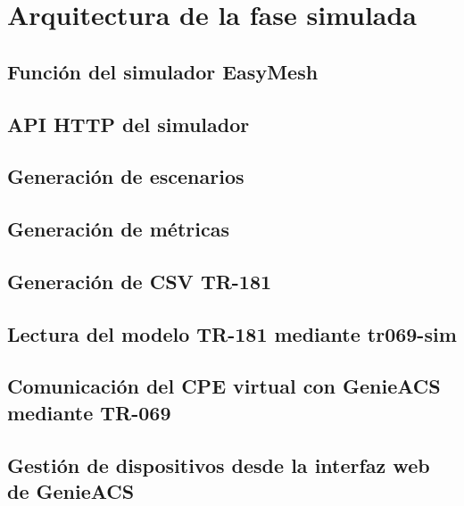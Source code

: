 \section{Arquitectura de la fase simulada}
\label{sec:arquitectura-fase-simulada}

\subsection{Función del simulador EasyMesh}
\label{subsec:funcion-simulador-easymesh}

\subsection{API HTTP del simulador}
\label{subsec:api-http-simulador}

\subsection{Generación de escenarios}
\label{subsec:generacion-escenarios}

\subsection{Generación de métricas}
\label{subsec:generacion-metricas}

\subsection{Generación de CSV TR-181}
\label{subsec:generacion-csv-tr181}

\subsection{Lectura del modelo TR-181 mediante tr069-sim}
\label{subsec:lectura-modelo-tr181-tr069-sim}

\subsection{Comunicación del CPE virtual con GenieACS mediante TR-069}
\label{subsec:comunicacion-cpe-virtual-genieacs-tr069}

\subsection{Gestión de dispositivos desde la interfaz web de GenieACS}
\label{subsec:gestion-dispositivos-interfaz-web-genieacs}

